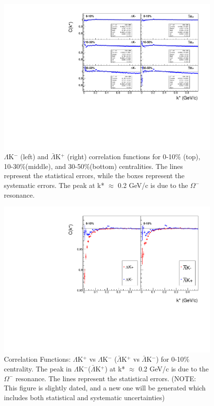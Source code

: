 \documentclass[../AnalysisNoteJBuxton.tex]{subfiles}
\begin{document}
\begin{figure}[h]
  \centering
  \includegraphics[width=\textwidth]{4_CorrelationFunctions/Figures/canKStarCfsLamKchMwConj.pdf}
  \caption[$\Lambda$K$^{-}$ and $\bar{\Lambda}$K$^{+}$ Correlation Functions]{$\Lambda$K$^{-}$ (left) and $\bar{\Lambda}$K$^{+}$ (right) correlation functions for 0-10\% (top), 10-30\%(middle), and 30-50\%(bottom) centralities.  The lines represent the statistical errors, while the boxes represent the systematic errors.  The peak at k* $\approx$ 0.2 GeV/c is due to the $\Omega^{-}$ resonance.}
  \label{fig:LamKchMwConjCfs}
\end{figure}

\begin{figure}[h]
  \centering
  \includegraphics[width=\textwidth]{4_CorrelationFunctions/Figures/canLamKchPvsLamKchM0010.pdf}
  \caption[Correlation Functions: $\Lambda$K$^{+}$ vs $\Lambda$K$^{-}$ for 0-10\% Centrality]{Correlation Functions: $\Lambda$K$^{+}$ vs $\Lambda$K$^{-}$ ($\bar{\Lambda}$K$^{+}$ vs $\bar{\Lambda}$K$^{-}$) for 0-10\% centrality.  The peak in $\Lambda$K$^{-}$($\bar{\Lambda}$K$^{+}$) at k* $\approx$ 0.2 GeV/c is due to the $\Omega^{-}$ resonance.  The lines represent the statistical errors. (NOTE: This figure is slightly dated, and a new one will be generated which includes both statistical and systematic uncertainties)}
  \label{fig:cLamcKchCfs0010}
\end{figure}

\clearpage
\end{document}

